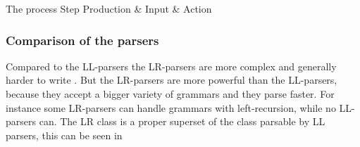 	  {The process	    					 }
{Step  	 }{Production & Input       & Action                     }{
}

\subsubsection{Comparison of the parsers}
Compared to the LL-parsers the LR-parsers are more complex and generally harder
to write \cite[pp. 193]{sebesta2013}. But the LR-parsers are more powerful than
the LL-parsers, because they accept a bigger variety of grammars and they parse
faster. For instance some LR-parsers can handle grammars with left-recursion,
while no LL-parsers can. The LR class is a proper superset of the class parsable
by LL parsers, this can be seen in 

